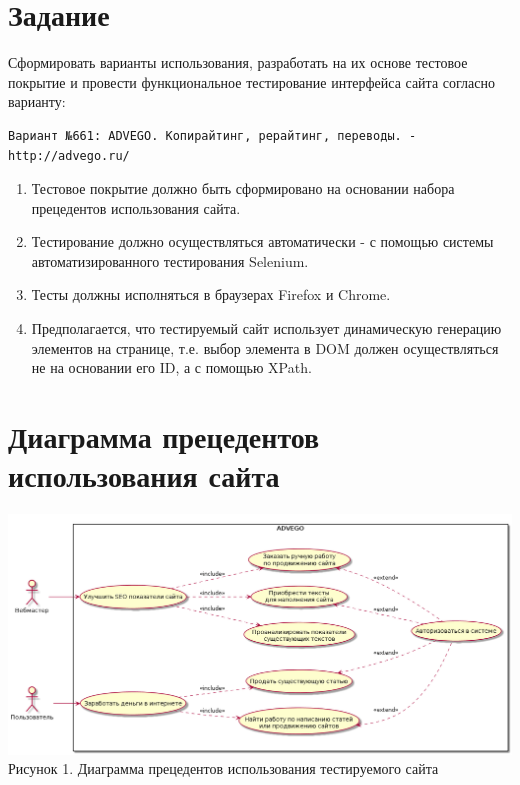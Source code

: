 \documentclass[listings]{labreport}
\begin{document}
\maketitlepage

\section*{Задание}

Сформировать варианты использования, разработать на их основе тестовое покрытие и провести функциональное тестирование интерфейса сайта согласно варианту:
\begin{verbatim}
Вариант №661: ADVEGO. Копирайтинг, рерайтинг, переводы. - http://advego.ru/
\end{verbatim}

\begin{enumerate}
\item Тестовое покрытие должно быть сформировано на основании набора прецедентов использования сайта.
\item Тестирование должно осуществляться автоматически - с помощью системы автоматизированного тестирования Selenium.
\item Тесты должны исполняться в браузерах Firefox и Chrome.
\item Предполагается, что тестируемый сайт использует динамическую генерацию элементов на странице, т.е. выбор элемента в DOM должен осуществляться не на основании его ID, а с помощью XPath.
\end{enumerate}

\section*{Диаграмма прецедентов использования сайта}

\begin{center}
\includegraphics[width=\textwidth]{Lab3.png}\\
Рисунок 1. Диаграмма прецедентов использования тестируемого сайта
\end{center}
\end{document}

